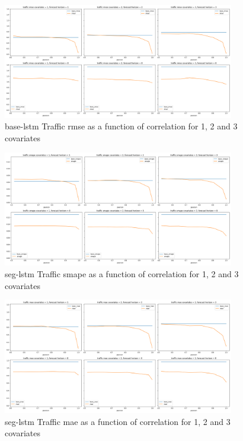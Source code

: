 \documentclass{article}
\begin{document}
  \begin{figure}[ht]
  \centering
  \includegraphics[width=0.9\textwidth]{figures/traffic-base-lstm-rmse.png}
  \caption{base-lstm Traffic rmse as a function of correlation for 1, 2 and 3 covariates}
  \label{fig:base_lstm_traffc_rmse}
  \end{figure}

  \begin{figure}[ht]
  \centering
  \includegraphics[width=0.9\textwidth]{figures/traffic-seg-lstm-smape.png}
  \caption{seg-lstm Traffic smape as a function of correlation for 1, 2 and 3 covariates}
  \label{fig:seg_lstm_traffic_smape}
  \end{figure}
  
  \begin{figure}[ht]
  \centering
  \includegraphics[width=0.9\textwidth]{figures/traffic-seg-lstm-mae.png}
  \caption{seg-lstm Traffic mae as a function of correlation for 1, 2 and 3 covariates}
  \label{fig:seg_lstm_traffic_mae}
  \end{figure}
  
\end{document}
